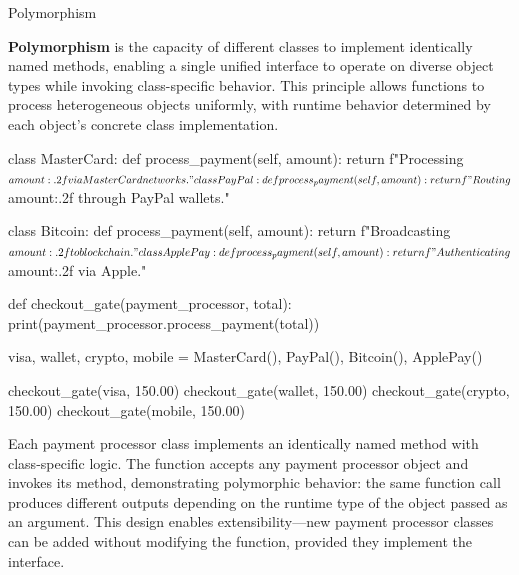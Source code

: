 \documentclass[10pt]{article}
\begin{document}
    \begin{core}[label=core:polymorphism]{Polymorphism}

      \textbf{Polymorphism} is the capacity of different classes to implement identically named methods, enabling a single unified interface to operate on diverse object types while invoking class-specific behavior. This principle allows functions to process heterogeneous objects uniformly, with runtime behavior determined by each object's concrete class implementation.

      \begin{pyconsole}

        class MasterCard:
            def process_payment(self, amount):
                return f"Processing ${amount:.2f} via MasterCard networks."

        class PayPal:
            def process_payment(self, amount):
                return f"Routing ${amount:.2f} through PayPal wallets."

        class Bitcoin:
            def process_payment(self, amount):
                return f"Broadcasting ${amount:.2f} to blockchain."

        class ApplePay:
            def process_payment(self, amount):
                return f"Authenticating ${amount:.2f} via Apple."
        
        def checkout_gate(payment_processor, total):
            print(payment_processor.process_payment(total))
        
        visa, wallet, crypto, mobile = MasterCard(), PayPal(), Bitcoin(), ApplePay()
        
        checkout_gate(visa, 150.00)
        checkout_gate(wallet, 150.00)
        checkout_gate(crypto, 150.00)
        checkout_gate(mobile, 150.00)

      \end{pyconsole}

      Each payment processor class implements an identically named  method with class-specific logic. The  function accepts any payment processor object and invokes its  method, demonstrating polymorphic behavior: the same function call produces different outputs depending on the runtime type of the object passed as an argument. This design enables extensibility---new payment processor classes can be added without modifying the  function, provided they implement the  interface.

    \end{core}
\end{document}
